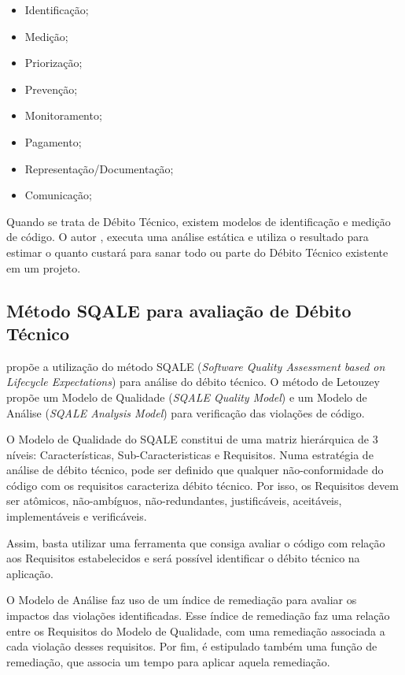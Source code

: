 \begin{itemize}
  \item Identificação;
  \item Medição;
  \item Priorização;
  \item Prevenção;
  \item Monitoramento;
  \item Pagamento;
  \item Representação/Documentação;
  \item Comunicação;
\end{itemize}

Quando se trata de Débito Técnico, existem modelos de identificação e medição de
código. O autor \cite{eisenberg}, executa uma análise estática e utiliza o
resultado para estimar o quanto custará para sanar todo ou parte do Débito
Técnico existente em um projeto.



\subsection{Método SQALE para avaliação de Débito Técnico}
\cite{letouzey} propõe a utilização do método SQALE (\textit{Software Quality Assessment
based on Lifecycle Expectations}) para análise do débito técnico. O método de
Letouzey propõe um Modelo de Qualidade (\textit{SQALE Quality Model}) e um Modelo de
Análise (\textit{SQALE Analysis Model}) para verificação das violações de código.

O Modelo de Qualidade do SQALE constitui de uma matriz hierárquica de 3 níveis:
Características, Sub-Caracteristicas e Requisitos. Numa estratégia de análise de
débito técnico, pode ser definido que qualquer não-conformidade do código com os
requisitos caracteriza débito técnico. Por isso, os Requisitos devem ser atômicos,
não-ambíguos, não-redundantes, justificáveis, aceitáveis, implementáveis e
verificáveis.

Assim, basta utilizar uma ferramenta que consiga avaliar o código com relação
aos Requisitos estabelecidos e será possível identificar o débito técnico na
aplicação.

O Modelo de Análise faz uso de um índice de remediação para avaliar os
impactos das violações identificadas. Esse índice de remediação faz uma relação
entre os Requisitos do Modelo de Qualidade, com uma remediação associada a
cada violação desses requisitos. Por fim, é estipulado também uma função de
remediação, que associa um tempo para aplicar aquela remediação.

